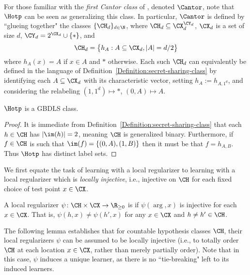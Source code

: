 \begin{remark}
For those familiar with the \emph{first Cantor class} of \citet{DS14}, denoted $\Cantor$, note that $\Hotp$ can be seen as generalizing this class. In particular, $\Cantor$ is defined by ``glueing together" the classes $\{ \CH_d \}_{d \in \N}$, where $\CH_d \subseteq \CX_d^{\CY_d}$, $\CX_d$ is a set of size $d$, $\CY_d = 2^{\CX_d} \cup \{*\}$, and 
\[ \CH_d = \big \{ h_A : A \subseteq \CX_d, |A| = d / 2 \big \} \]
where 
$h_A(x) = A$ if $x \in A$ and $*$ otherwise. 
Each such $\CH_d$ can equivalently be defined in the language of Definition~\ref{Definition:secret-sharing-class} by identifying each $A \subseteq \CX_d$ with its characteristic vector, setting $h_A := h_{A, 1^d}$, and considering the relabeling $(1, 1^d) \mapsto *$, $(0, A) \mapsto A$. 
\end{remark}

\begin{lemma}
$\Hotp$ is a GBDLS class.
\end{lemma}
\begin{proof}
It is immediate from Definition~\ref{Definition:secret-sharing-class} that each $h \in \CH$ has $|\im(h)| = 2$, meaning $\CH$ is generalized binary. Furthermore, if $f \in \CH$ is such that $\im(f) = \{(0, A), (1, B)\}$ then it must be that $f = h_{A, B}$. Thus $\Hotp$ has distinct label sets. 
\end{proof}

We first equate the task of learning with a local regularizer to learning with a local regularizer which is \emph{locally injective}, i.e., injective on $\CH$ for each fixed choice of test point $x \in \CX$. 

\begin{definition}
A local regularizer $\psi \colon \CH \times \CX \to \R_{\geq 0}$ is  if $\psi(\arg, x)$ is injective for each $x \in \CX$. That is, $\psi(h, x) \neq \psi(h', x)$ for any $x \in \CX$ and $h \neq h' \in \CH$. 
\end{definition}

The following lemma establishes that for countable hypothesis classes $\CH$, their local regularizers $\psi$ can be assumed to be locally injective (i.e., to totally order $\CH$ at each location $x \in \CX$, rather than merely partially order). Note that in this case, $\psi$ induces a unique learner, as there is no ``tie-breaking" left to its induced learners. 

